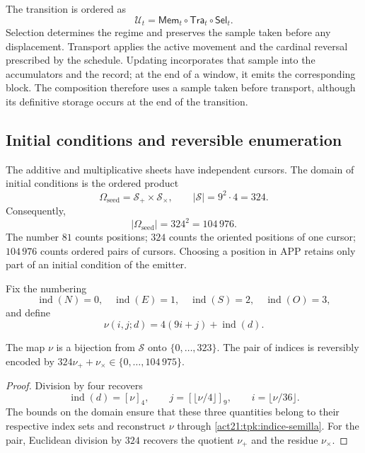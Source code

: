 The transition is ordered as
\begin{equation}
 \mathcal U_t=\mathsf{Mem}_t\circ\mathsf{Tra}_t\circ\mathsf{Sel}_t.
 \label{act21:tpk:composicion}
\end{equation}
Selection determines the regime and preserves the sample taken before any
displacement. Transport applies the active movement and the cardinal
reversal prescribed by the schedule. Updating incorporates that sample
into the accumulators and the record; at the end of a window, it emits
the corresponding block. The composition therefore uses a sample taken
before transport, although its definitive storage occurs at the end of
the transition.

\subsection{Initial conditions and reversible enumeration}
\label{act21:tpk:semillas}

The additive and multiplicative sheets have independent cursors. The
domain of initial conditions is the ordered product
\[
 \Omega_{\mathrm{seed}}=\mathcal S_+\times\mathcal S_\times,
 \qquad |\mathcal S|=9^2\cdot4=324.
\]
Consequently,
\begin{equation}
 |\Omega_{\mathrm{seed}}|=324^2=104\,976.
 \label{act21:tpk:censo-inicial}
\end{equation}
The number \(81\) counts positions; \(324\) counts the oriented positions
of one cursor; \(104\,976\) counts ordered pairs of cursors. Choosing a
position in APP retains only part of an initial condition of the emitter.

Fix the numbering
\[
 \operatorname{ind}(N)=0,\quad\operatorname{ind}(E)=1,\quad
 \operatorname{ind}(S)=2,\quad\operatorname{ind}(O)=3,
\]
and define
\begin{equation}
 \nu(i,j;d)=4(9i+j)+\operatorname{ind}(d).
 \label{act21:tpk:indice-semilla}
\end{equation}

\begin{proposition}
\label{act21:tpk:enumeracion}
The map \(\nu\) is a bijection from \(\mathcal S\) onto
\(\{0,\ldots,323\}\). The pair of indices is reversibly encoded by
\(324\nu_++\nu_\times\in\{0,\ldots,104\,975\}\).
\end{proposition}
\begin{proof}
Division by four recovers
\[
 \operatorname{ind}(d)=[\nu]_4,\qquad
 j=[\lfloor\nu/4\rfloor]_9,\qquad i=\lfloor\nu/36\rfloor.
\]
The bounds on the domain ensure that these three quantities belong to
their respective index sets and reconstruct \(\nu\) through
\eqref{act21:tpk:indice-semilla}. For the pair, Euclidean division by \(324\)
recovers the quotient \(\nu_+\) and the residue \(\nu_\times\).
\end{proof}

